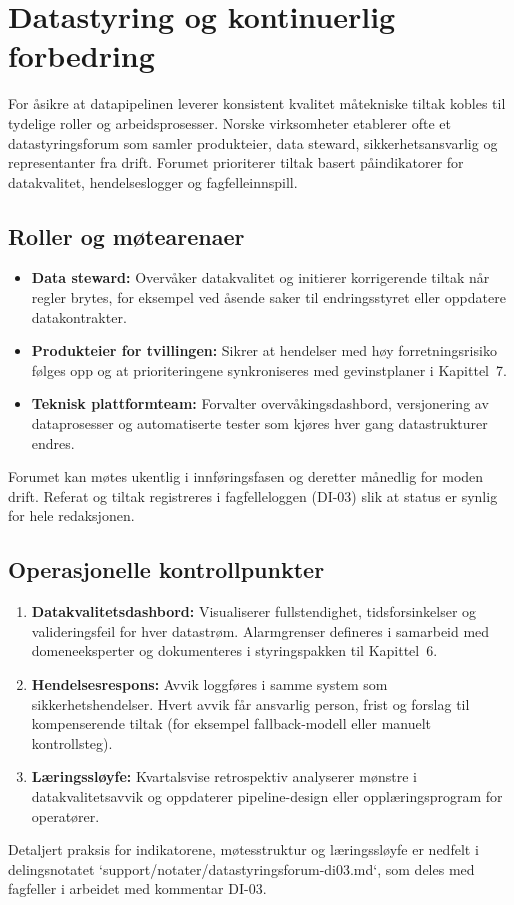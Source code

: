 \section{Datastyring og kontinuerlig forbedring}
For \aa sikre at datapipelinen leverer konsistent kvalitet m\aa tekniske tiltak kobles til tydelige roller og arbeidsprosesser. Norske virksomheter etablerer ofte et datastyringsforum som samler produkteier, data steward, sikkerhetsansvarlig og representanter fra drift. Forumet prioriterer tiltak basert p\aa indikatorer for datakvalitet, hendelseslogger og fagfelleinnspill.

\subsection{Roller og m\o tearenaer}
\begin{itemize}
    \item \textbf{Data steward:} Overv\aa ker datakvalitet og initierer korrigerende tiltak n\aa r regler brytes, for eksempel ved \aa sende saker til endringsstyret eller oppdatere datakontrakter.
    \item \textbf{Produkteier for tvillingen:} Sikrer at hendelser med h\o y forretningsrisiko f\o lges opp og at prioriteringene synkroniseres med gevinstplaner i Kapittel~7.
    \item \textbf{Teknisk plattformteam:} Forvalter overv\aa kingsdashbord, versjonering av dataprosesser og automatiserte tester som kj\o res hver gang datastrukturer endres.
\end{itemize}
Forumet kan m\o tes ukentlig i innf\o ringsfasen og deretter m\aa nedlig for moden drift. Referat og tiltak registreres i fagfelleloggen (DI-03) slik at status er synlig for hele redaksjonen.

\subsection{Operasjonelle kontrollpunkter}
\begin{enumerate}
    \item \textbf{Datakvalitetsdashbord:} Visualiserer fullstendighet, tidsforsinkelser og valideringsfeil for hver datastr\o m. Alarmgrenser defineres i samarbeid med domeneeksperter og dokumenteres i styringspakken til Kapittel~6.
    \item \textbf{Hendelsesrespons:} Avvik loggf\o res i samme system som sikkerhetshendelser. Hvert avvik f\aa r ansvarlig person, frist og forslag til kompenserende tiltak (for eksempel fallback-modell eller manuelt kontrollsteg).
    \item \textbf{L\ae ringssl\o yfe:} Kvartalsvise retrospektiv analyserer m\o nstre i datakvalitetsavvik og oppdaterer pipeline-design eller oppl\ae ringsprogram for operat\o rer.
\end{enumerate}
Detaljert praksis for indikatorene, m\o tesstruktur og l\ae ringssl\o yfe er nedfelt i delingsnotatet `support/notater/datastyringsforum-di03.md`,
som deles med fagfeller i arbeidet med kommentar DI-03.

